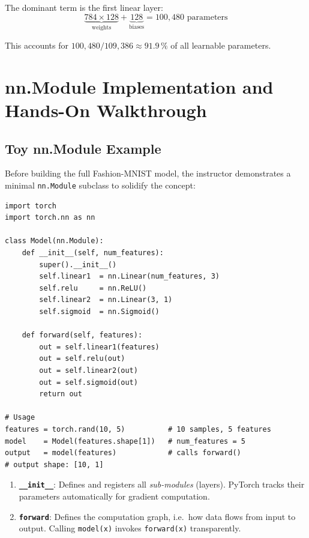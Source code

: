 \documentclass[12pt,a4paper]{article}
\begin{document}
The dominant term is the first linear layer:
\begin{equation}
  \underbrace{784 \times 128}_{\text{weights}} + \underbrace{128}_{\text{biases}}
  = 100{,}480 \text{ parameters}
  \label{eq:first-layer-params}
\end{equation}

This accounts for $100{,}480 / 109{,}386 \approx 91.9\,\%$ of all learnable
parameters.

\section{nn.Module Implementation and Hands-On Walkthrough}
\label{sec:implementation}

\subsection{Toy nn.Module Example}
\label{subsec:toy-module}

Before building the full Fashion-MNIST model, the instructor demonstrates a
minimal \texttt{nn.Module} subclass to solidify the concept:

\begin{tcolorbox}[colback=gray!5!white, colframe=gray!60!black,
  fonttitle=\bfseries, title=Listing 3: Toy nn.Module (binary classification)]
\begin{verbatim}
import torch
import torch.nn as nn

class Model(nn.Module):
    def __init__(self, num_features):
        super().__init__()
        self.linear1  = nn.Linear(num_features, 3)
        self.relu     = nn.ReLU()
        self.linear2  = nn.Linear(3, 1)
        self.sigmoid  = nn.Sigmoid()

    def forward(self, features):
        out = self.linear1(features)
        out = self.relu(out)
        out = self.linear2(out)
        out = self.sigmoid(out)
        return out

# Usage
features = torch.rand(10, 5)          # 10 samples, 5 features
model    = Model(features.shape[1])   # num_features = 5
output   = model(features)            # calls forward()
# output shape: [10, 1]
\end{verbatim}
\end{tcolorbox}

\begin{example}[title=Two roles of nn.Module]
\begin{enumerate}[label=\arabic*.]
  \item \textbf{\texttt{\_\_init\_\_}}: Defines and registers all
        \emph{sub-modules} (layers). PyTorch tracks their parameters
        automatically for gradient computation.
  \item \textbf{\texttt{forward}}: Defines the computation graph,
        i.e.\ how data flows from input to output. Calling \texttt{model(x)}
        invokes \texttt{forward(x)} transparently.
\end{enumerate}
\end{example}
\end{document}
